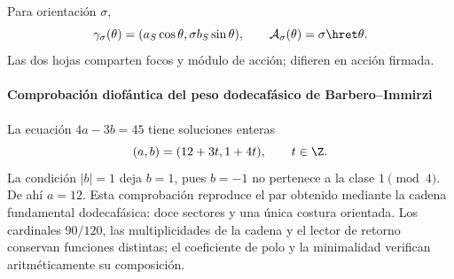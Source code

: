 Para orientación \(\sigma\),
\[
\gamma_\sigma(\theta)
=(a_S\cos\theta,\sigma b_S\sin\theta),
\qquad
\mathcal A_\sigma(\theta)=\sigma\hret\theta.
\]
Las dos hojas comparten focos y módulo de acción; difieren en acción firmada.

\paragraph{Comprobación diofántica del peso dodecafásico de Barbero--Immirzi}

La ecuación \(4a-3b=45\) tiene soluciones enteras
\[
(a,b)=(12+3t,1+4t),\qquad t\in\Z.
\]
La condición \(|b|=1\) deja \(b=1\), pues \(b=-1\) no pertenece a la clase
\(1\pmod4\). De ahí \(a=12\). Esta comprobación reproduce el par obtenido mediante la cadena fundamental
dodecafásica: doce sectores y una única costura orientada. Los cardinales
\(90/120\), las multiplicidades de la cadena y el lector de retorno
conservan funciones distintas; el coeficiente de polo y la minimalidad
verifican aritméticamente su composición.
